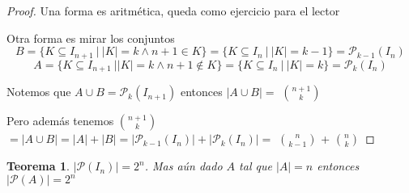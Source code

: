\documentclass{article}
\theoremstyle{break}
\newtheorem{theorem}{Teorema}[section]
\begin{document}
    \begin{proof}
        Una forma es aritmética, queda como ejercicio para el lector

        Otra forma es mirar los conjuntos $$B = \{K \subseteq I_{n+1} \ | \ |K|=k \land n+1 \in K\}  = \{K \subseteq I_{n} \ | \ |K|=k-1\} = \mathcal{P}_{k-1}(I_n)$$
         $$A = \{K \subseteq I_{n+1} \ | |K| = k \land n+1 \notin K\}  = \{K \subseteq I_{n} \ | \ |K|=k \} = \mathcal{P}_{k}(I_n)$$

	 Notemos que $A\cup B = \mathcal{P}_{k}(I_{n+1})$ entonces $|A\cup B| =$ $\binom{n+1}{k}$  
        
	 Pero además tenemos $\binom{n+1}{k}$  $= |A\cup B| = |A| + |B| = |\mathcal{P}_{k-1}(I_n)| + |\mathcal{P}_{k}(I_n)|  = $ $\binom{n}{k-1}$   + $\binom{n}{k}$  
    \end{proof}

    \begin{theorem}
        $|\mathcal{P}(I_n)| = 2^n$. Mas aún dado $A$ tal que $|A|=n$ entonces $|\mathcal{P}(A)| = 2^n$
    \end{theorem}
\end{document}

